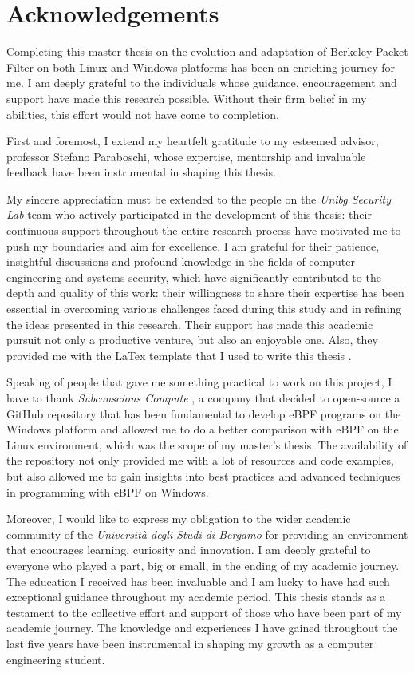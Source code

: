 \section*{Acknowledgements}

Completing this master thesis on the evolution and adaptation of Berkeley Packet Filter on both Linux and Windows platforms has been an enriching journey for me. 
I am deeply grateful to the individuals whose guidance, encouragement and support have made this research possible. 
Without their firm belief in my abilities, this effort would not have come to completion.

First and foremost, I extend my heartfelt gratitude to my esteemed advisor, professor Stefano Paraboschi, whose expertise, mentorship and invaluable feedback have been instrumental in shaping this thesis. 

My sincere appreciation must be extended to the people on the \textit{Unibg Security Lab} \cite{UnibgSeclabWebsite} team who actively participated in the development of this thesis: their continuous support throughout the entire research process have motivated me to push my boundaries and aim for excellence. 
I am grateful for their patience, insightful discussions and profound knowledge in the fields of computer engineering and systems security, which have significantly contributed to the depth and quality of this work: their willingness to share their expertise has been essential in overcoming various challenges faced during this study and in refining the ideas presented in this research.
Their support has made this academic pursuit not only a productive venture, but also an enjoyable one.
Also, they provided me with the LaTex template that I used to write this thesis \cite{UnibgLatexTemp}.

Speaking of people that gave me something practical to work on this project, I have to thank \textit{Subconscious Compute} \cite{SubComWebsite}, a company that decided to open-source a GitHub repository that has been fundamental to develop eBPF programs on the Windows platform and allowed me to do a better comparison with eBPF on the Linux environment, which was the scope of my master's thesis.
The availability of the repository not only provided me with a lot of resources and code examples, but also allowed me to gain insights into best practices and advanced techniques in programming with eBPF on Windows. 

Moreover, I would like to express my obligation to the wider academic community of the \textit{Università degli Studi di Bergamo} \cite{UnibgWebsite} for providing an environment that encourages learning, curiosity and innovation. 
I am deeply grateful to everyone who played a part, big or small, in the ending of my academic journey. 
The education I received has been invaluable and I am lucky to have had such exceptional guidance throughout my academic period. 
This thesis stands as a testament to the collective effort and support of those who have been part of my academic journey. 
The knowledge and experiences I have gained throughout the last five years have been instrumental in shaping my growth as a computer engineering student.

